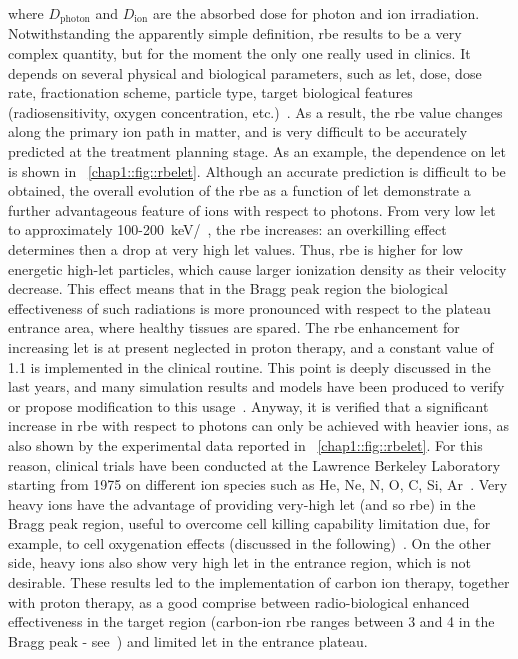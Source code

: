where $D_{\mathrm{photon}}$ and $D_{\mathrm{ion}}$ are the absorbed dose for photon and ion irradiation. Notwithstanding the apparently simple definition, \gls{rbe} results to be a very complex quantity, but for the moment the only one really used in clinics. It depends on several physical and biological parameters, such as \gls{let}, dose, dose rate, fractionation scheme, particle type, target biological features (radiosensitivity, oxygen concentration, etc.)~\parencite{Durante2009}. As a result, the \gls{rbe} value changes along the primary ion path in matter, and is very difficult to be accurately predicted at the treatment planning stage. As an example, the dependence on \gls{let} is shown in \figurename~\ref{chap1::fig::rbelet}.  Although an accurate prediction is difficult to be obtained, the overall evolution of the \gls{rbe} as a function of \gls{let} demonstrate a further advantageous feature of ions with respect to photons. From very low \gls{let} to approximately 100-200~keV/\charmum ~, the \gls{rbe} increases: an overkilling effect determines then a drop at very high \gls{let} values. Thus, \gls{rbe} is higher for low energetic high-\gls{let} particles, which cause larger ionization density as their velocity decrease. This effect means that in the Bragg peak region the biological effectiveness of such radiations is more pronounced with respect to the plateau entrance area, where healthy tissues are spared. The \gls{rbe} enhancement for increasing \gls{let} is at present neglected in proton therapy, and a constant value of 1.1 is implemented in the clinical routine. This point is deeply discussed in the last years, and many simulation results and models have been produced to verify or propose modification to this usage~\parencite{Giantsoudi2013, Sethi2014, Guan2015, Jones2015, McNamara2015, Giovannini2016}. Anyway,  it is verified that a significant increase in \gls{rbe} with respect to photons can only be achieved with heavier ions, as also shown by the experimental data reported in \figurename~\ref{chap1::fig::rbelet}. For this reason, clinical trials have been conducted at the Lawrence Berkeley Laboratory starting from 1975 on different ion species such as He, Ne, N, O, C, Si, Ar~\parencite{Castro1995}. Very heavy ions have the advantage of providing very-high \gls{let} (and so \gls{rbe}) in the Bragg peak region, useful to overcome cell killing capability limitation due, for example, to cell oxygenation effects (discussed in the following)~\parencite{Blakely1984}. On the other side, heavy ions also show very high \gls{let} in the entrance region, which is not desirable. These results led to the implementation of carbon ion therapy, together with proton therapy, as a good comprise between radio-biological enhanced effectiveness in the target region (carbon-ion \gls{rbe} ranges between 3 and 4 in the Bragg peak - see~\cite{Wilkens2008}) and limited \gls{let} in the entrance plateau. 
